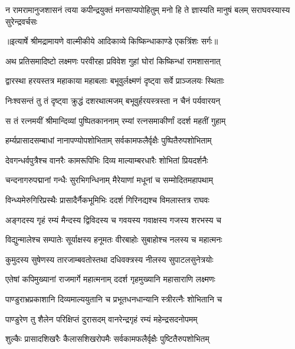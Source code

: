 \fourlineindentedshloka
{न रामरामानुजशासनं त्वया}
{कपीन्द्रयुक्तं मनसाप्यपोहितुम्}
{मनो हि ते ज्ञास्यति मानुषं बलम्}
{सराघवस्यास्य सुरेन्द्रवर्चसः} %


{॥इत्यार्षे श्रीमद्रामायणे वाल्मीकीये आदिकाव्ये किष्किन्धाकाण्डे एकत्रिंशः सर्गः॥}


\twolineshloka
{अथ प्रतिसमादिष्टो लक्ष्मणः परवीरहा}
{प्रविवेश गुहां घोरां किष्किन्धां रामशासनात्} %

\twolineshloka
{द्वारस्था हरयस्तत्र महाकाया महाबलाः}
{बभूवुर्लक्ष्मणं दृष्ट्वा सर्वे प्राञ्जलयः स्थिताः} %

\twolineshloka
{निःश्वसन्तं तु तं दृष्ट्वा क्रुद्धं दशरथात्मजम्}
{बभूवुर्हरयस्त्रस्ता न चैनं पर्यवारयन्} %

\twolineshloka
{स तं रत्नमयीं श्रीमान्दिव्यां पुष्पितकाननाम्}
{रम्यां रत्नसमाकीर्णां ददर्श महतीं गुहाम्} %

\twolineshloka
{हर्म्यप्रासादसम्बाधां नानापण्योपशोभिताम्}
{सर्वकामफलैर्वृक्षैः पुष्पितैरुपशोभिताम्} %

\twolineshloka
{देवगन्धर्वपुत्रैश्च वानरैः कामरूपिभिः}
{दिव्य माल्याम्बरधारैः शोभितां प्रियदर्शनैः} %

\twolineshloka
{चन्दनागरुपद्मानां गन्धैः सुरभिगन्धिनाम्}
{मैरेयाणां मधूनां च सम्मोदितमहापथाम्} %

\twolineshloka
{विन्ध्यमेरुगिरिप्रस्थैः प्रासादैर्नैकभूमिभिः}
{ददर्श गिरिनद्यश्च विमलास्तत्र राघवः} %

\twolineshloka
{अङ्गदस्य गृहं रम्यं मैन्दस्य द्विविदस्य च}
{गवयस्य गवाक्षस्य गजस्य शरभस्य च} %

\twolineshloka
{विद्युन्मालेश्च सम्पातेः सूर्याक्षस्य हनूमतः}
{वीरबाहोः सुबाहोश्च नलस्य च महात्मनः} %

\twolineshloka
{कुमुदस्य सुषेणस्य तारजाम्बवतोस्तथा}
{दधिवक्त्रस्य नीलस्य सुपाटलसुनेत्रयोः} %

\twolineshloka
{एतेषां कपिमुख्यानां राजमार्गे महात्मनाम्}
{ददर्श गृहमुख्यानि महासाराणि लक्ष्मणः} %

\twolineshloka
{पाण्डुराभ्रप्रकाशानि दिव्यमाल्ययुतानि च}
{प्रभूतधनधान्यानि स्त्रीरत्नैः शोभितानि च} %

\twolineshloka
{पाण्डुरेण तु शैलेन परिक्षिप्तं दुरासदम्}
{वानरेन्द्रगृहं रम्यं महेन्द्रसदनोपमम्} %

\twolineshloka
{शुल्कैः प्रासादशिखरैः कैलासशिखरोपमैः}
{सर्वकामफलैर्वृक्षैः पुष्टितैरुपशोभितम्} %

